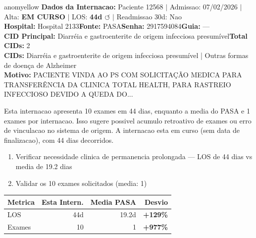 \documentclass[a4paper,10pt]{article}
\begin{document}
\begin{anomalycard}[Internacao 182811 | PASA | MODERADO (z=2.23)]{anomyellow}
\textbf{Dados da Internacao:} Paciente 12568 $\mid$ Admissao: 07/02/2026 $\mid$ Alta: \textcolor{anomorange}{\textbf{EM CURSO}} $\mid$ LOS: \textbf{44d \textcolor{anomorange}{$\circlearrowleft$}} $\mid$ Readmissao 30d: Nao\\
\textbf{Hospital:} Hospital 2133\quad\textbf{Fonte:} PASA\quad\textbf{Senha:} 2917594084\quad\textbf{Guia:} ---\\
\textbf{CID Principal:} {\small Diarréia e gastroenterite de origem infecciosa presumível}\quad\textbf{Total CIDs:} 2\\

\textbf{CIDs:} {\scriptsize Diarréia e gastroenterite de origem infecciosa presumível | Outras formas de doença de Alzheimer}\\

\textbf{Motivo:} {\scriptsize PACIENTE VINDA AO PS COM SOLICITAÇÃO MEDICA PARA TRANSFERÊNCIA DA CLINICA TOTAL HEALTH, PARA RASTREIO INFECCIOSO DEVIDO A QUEDA DO...}\\

\vspace{2pt}\begin{tcolorbox}[colback=severityred!20,colframe=anomyellow,title={\textbf{Interpretacao de Negocio}},fonttitle=\bfseries\small,left=4pt,right=4pt,top=3pt,bottom=3pt]
{\small Esta internacao apresenta 10 exames em 44 dias, enquanto a media do PASA e 1 exames por internacao. Isso sugere possivel acumulo retroativo de exames ou erro de vinculacao no sistema de origem. A internacao esta em curso (sem data de finalizacao), com 44 dias decorridos.}
\end{tcolorbox}
\begin{tcolorbox}[colback=severityyellow!30,colframe=anomorange,title={\textbf{Recomendacoes Especificas}},fonttitle=\bfseries\small,left=4pt,right=4pt,top=3pt,bottom=3pt]
\begin{enumerate}[nosep,leftmargin=16pt]
\item {\small Verificar necessidade clinica de permanencia prolongada --- LOS de 44 dias vs media de 19.2 dias}
\item {\small Validar os 10 exames solicitados (media: 1)}
\end{enumerate}
\end{tcolorbox}
\begin{center}\begin{tabular}{l r r r}\toprule\textbf{Metrica} & \textbf{Esta Intern.} & \textbf{Media PASA} & \textbf{Desvio} \\\midrule
LOS & 44d & 19.2d & \textcolor{anomred}{\textbf{+129\%}} \\
Exames & 10 & 1 & \textcolor{anomred}{\textbf{+977\%}} \\
\bottomrule\end{tabular}\end{center}


\end{anomalycard}
\end{document}
